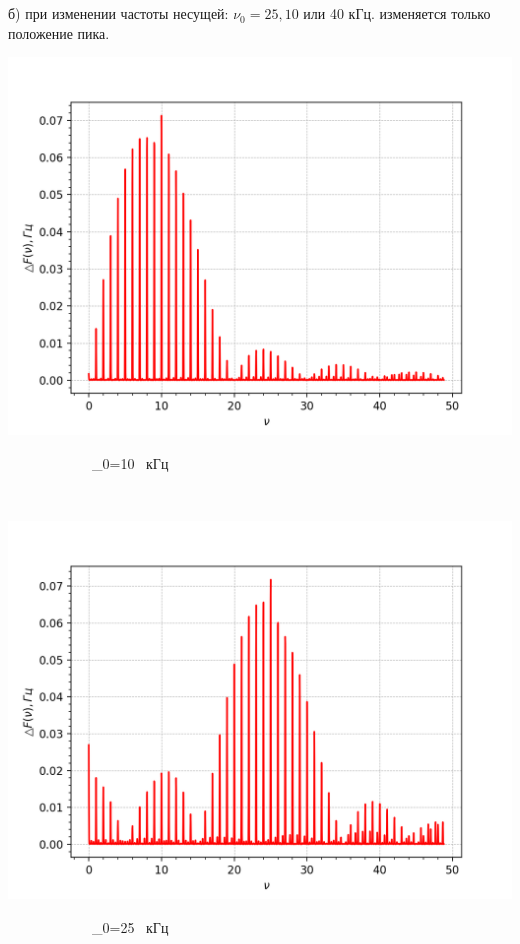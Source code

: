 \documentclass[a4paper,12pt]{article} %
\begin{document}
\\
\
\\


б) при изменении частоты несущей: $\nu_{0}=25,10$ или 40 кГц. изменяется только положение пика. \\

\begin{minipage}{0.3\textwidth}
\includegraphics[width=\linewidth]{6.png}\\
\begin{center}
\ \ \ \ \ \ \ \ \ \ \ \ \nu_{0}=10 \ кГц
\end{center}
\end{minipage}
\begin{minipage}{0.05\textwidth}
\begin{center}
\ \ \Rightarrow
\end{center}
\end{minipage}
\begin{minipage}{0.3\textwidth}
\includegraphics[width=\linewidth]{7.png}\\
\begin{center}
\ \ \ \ \ \ \ \ \ \ \ \ \nu_{0}=25 \ кГц
\end{center}
\end{minipage}
\end{document}
